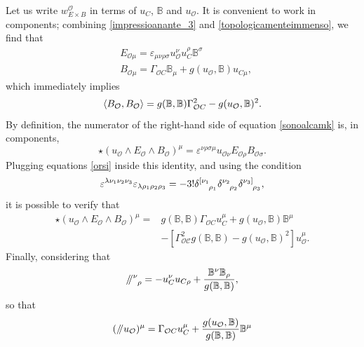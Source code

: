 \documentclass[usenatbib%
]{mnras}
\newcommand{\paral}{\mathbin{ \, \!/\mkern-5mu/\!} \,}
\begin{document}
Let us write $w_{E\times B}^{\mathcal{O}}$ in terms of $u_C$, $\mathbb{B}$ and $u_\mathcal{O}$. 
It is convenient to work in components; combining \eqref{impressioanante_3} and \eqref{topologicamenteimmenso}, we find that
\begin{equation}\label{orsi}
\begin{split}
& E_{\mathcal{O}\mu} = \varepsilon_{\mu \nu \rho \sigma} u_{\mathcal{O}}^\nu u_C^\rho \mathbb{B}^\sigma \\
& B_{\mathcal{O}\mu} = \Gamma_{\mathcal{O}C} \mathbb{B}_\mu + g(u_\mathcal{O},\mathbb{B}) u_{C\mu},
\end{split}
\end{equation}
which immediately implies
\begin{equation}
\braket{B_\mathcal{O},B_\mathcal{O}} =  g(\mathbb{B},\mathbb{B})\Gamma_{\mathcal{O}C}^2 - g(u_\mathcal{O},\mathbb{B})^2.
\end{equation}
By definition, the numerator of the right-hand side of equation \eqref{sonoalcamk} is, in components,
\begin{equation}
\star (u_\mathcal{O} \wedge E_\mathcal{O} \wedge B_\mathcal{O})^\mu = \varepsilon^{\nu \rho \sigma \mu} u_{\mathcal{O}\nu} E_{\mathcal{O}\rho} B_{\mathcal{O}\sigma}.
\end{equation}
Plugging equations \eqref{orsi} inside this identity, and using the condition
\begin{equation}
\varepsilon^{\lambda \nu_1 \nu_2 \nu_3} \varepsilon_{\lambda \rho_1 \rho_2 \rho_3} = -3! \delta\indices{^{[\nu_1} _{\rho_1}} \delta\indices{^{\nu_2} _{\rho_2}} \delta\indices{^{\nu_3]} _{\rho_3}},
\end{equation}
it is possible to verify that
\begin{equation}
\begin{split}
 \star (u_\mathcal{O} \wedge E_\mathcal{O} \wedge B_\mathcal{O})^\mu = & 
 g(\mathbb{B},\mathbb{B}) \Gamma_{\mathcal{O}C} u_C^\mu + g(u_\mathcal{O},\mathbb{B}) \mathbb{B}^\mu \\ 
 & - [\Gamma_{\mathcal{OC}}^2 g(\mathbb{B},\mathbb{B})-g(u_\mathcal{O}, \mathbb{B})^2 ] u_{\mathcal{O}}^\mu.
\end{split}
\end{equation}
Finally, considering that 
\begin{equation}
\paral \indices{^\nu _\rho} = - u_C^\nu u_{C\rho} + \dfrac{\mathbb{B}^\nu \mathbb{B}_\rho}{g(\mathbb{B},\mathbb{B})},
\end{equation}
so that
\begin{equation}
(\paral u_\mathcal{O})^\mu = \Gamma_{\mathcal{O}C} u_C^\mu + \dfrac{g(u_\mathcal{O},\mathbb{B})}{g(\mathbb{B} , \mathbb{B})} \mathbb{B}^\mu
\end{equation}
\end{document}
